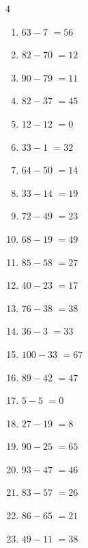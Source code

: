 \begin{multicols}{4}
\begin{enumerate}
  \item $63-7$
        $=56$

  \item $82-70$
        $=12$

  \item $90-79$
        $=11$

  \item $82-37$
        $=45$

  \item $12-12$
        $=0$

  \item $33-1$
        $=32$

  \item $64-50$
        $=14$

\columnbreak %

  \item $33-14$
        $=19$

  \item $72-49$
        $=23$

  \item $68-19$
        $=49$

  \item $85-58$
        $=27$

  \item $40-23$
        $=17$

  \item $76-38$
        $=38$

  \item $36-3$
        $=33$

  \item $100-33$
        $=67$

  \item $89-42$
        $=47$

  \item $5-5$
        $=0$

  \item $27-19$
        $=8$

  \item $90-25$
        $=65$

  \item $93-47$
        $=46$

  \item $83-57$
        $=26$

  \item $86-65$
        $=21$

  \item $49-11$
        $=38$


\end{enumerate}
\end{multicols}

